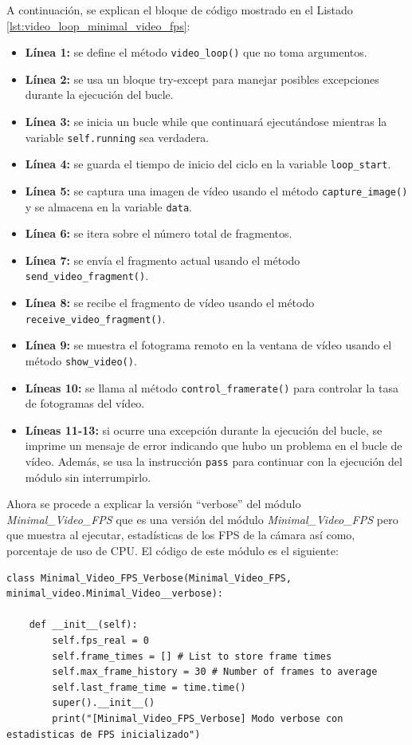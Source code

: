 A continuación, se explican el bloque de código mostrado en el Listado \ref{lst:video_loop_minimal_video_fps}:

\begin{itemize}
    \item \textbf{Línea 1:} se define el método \texttt{video\_loop()} que no toma argumentos.
    \item \textbf{Línea 2:} se usa un bloque try-except para manejar posibles excepciones durante la ejecución del bucle.
    \item \textbf{Línea 3:} se inicia un bucle while que continuará ejecutándose mientras la variable \texttt{self.running} sea verdadera.
    \item \textbf{Línea 4:} se guarda el tiempo de inicio del ciclo en la variable \texttt{loop\_start}.
    \item \textbf{Línea 5:} se captura una imagen de vídeo usando el método \texttt{capture\_image()} y se almacena en la variable \texttt{data}.
    \item \textbf{Línea 6:} se itera sobre el número total de fragmentos.
    \item \textbf{Línea 7:} se envía el fragmento actual usando el método \texttt{send\_video\_fragment()}.
    \item \textbf{Línea 8:} se recibe el fragmento de vídeo usando el método \texttt{receive\_video\_fragment()}.
    \item \textbf{Línea 9:} se muestra el fotograma remoto en la ventana de vídeo usando el método \texttt{show\_video()}.
    \item \textbf{Líneas 10:} se llama al método \texttt{control\_framerate()} para controlar la tasa de fotogramas del vídeo.
    \item \textbf{Líneas 11-13:} si ocurre una excepción durante la ejecución del bucle, se imprime un mensaje de error indicando que hubo un problema en el bucle de vídeo. Además, se usa la instrucción \texttt{pass} para continuar con la ejecución del módulo sin interrumpirlo.
\end{itemize}
\vspace{\baselineskip}

Ahora se procede a explicar la versión ``verbose'' del módulo \textit{Minimal\_Video\_FPS} que es una versión del módulo \textit{Minimal\_Video\_FPS} pero que muestra al ejecutar, estadísticas de los FPS de la cámara así como, porcentaje de uso de CPU. El código de este módulo es el siguiente:
\begin{lstlisting}[style=pythonstyle, caption={Comienzo del módulo Minimal\_Video\_FPS\_Verbose y su inicialización.}, label={lst:comienzo_minimal_video_fps_verbose}]
class Minimal_Video_FPS_Verbose(Minimal_Video_FPS, minimal_video.Minimal_Video__verbose):

    def __init__(self):
        self.fps_real = 0
        self.frame_times = [] # List to store frame times
        self.max_frame_history = 30 # Number of frames to average
        self.last_frame_time = time.time() 
        super().__init__()
        print("[Minimal_Video_FPS_Verbose] Modo verbose con estadisticas de FPS inicializado")
\end{lstlisting}
\vspace{\baselineskip}

